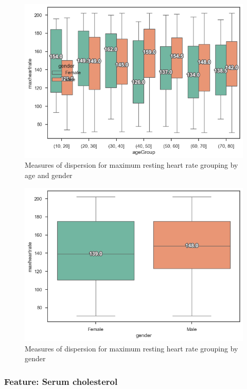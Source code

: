 \begin{figure}
    \caption{Measures of dispersion for maximum resting heart rate grouping by age and gender}\label{boxplot-heartrate-age}
    \centering
    \includegraphics[width=\linewidth]{media/boxplot-03-agegroup-gender-heartrate.png}
\end{figure}

\begin{figure}
    \caption{Measures of dispersion for maximum resting heart rate grouping by gender}\label{boxplot-heartrate-gender}
    \centering
    \includegraphics[width=\linewidth]{media/boxplot-04-gender-heartrate.png}
\end{figure}

\subsubsection{Feature: Serum cholesterol}

